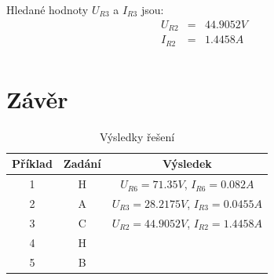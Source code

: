 \documentclass[a4paper,oneside,12pt]{article}
\begin{document}
	Hledané hodnoty $U_{R3}$ a $I_{R3}$ jsou:
	\begin{eqnarray*}
		U_{R2} &= & 44.9052 V\\
		I_{R2} &= & 1.4458 A\\
	\end{eqnarray*}

	\newpage

	\section{Závěr}
	\maketitle

	\begin{table}[ht]
		\begin{center}
			\begin{tabular}{|c|c|c|}
				\hline
				Příklad & Zadání & Výsledek \\
				\hline
				1 & H & $U_{R6} = 71.35 V$, $I_{R6} = 0.082 A$ \\
				\hline
				2 & A & $U_{R3} = 28.2175 V$, $I_{R3} = 0.0455 A$ \\
				\hline
				3 & C & $U_{R2} = 44.9052 V$, $I_{R2} = 1.4458 A$ \\
				\hline
				4 & H &   \\
				\hline
				5 & B &  \\
				\hline
			\end{tabular}
			\caption{Výsledky řešení}
		\end{center}
	\end{table}
\end{document}
